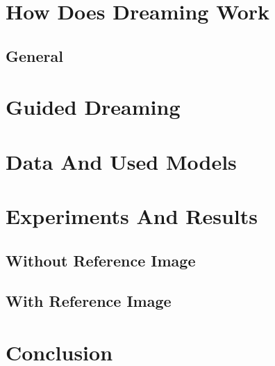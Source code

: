 \documentclass{article}[]
\begin{document}
	\section{How Does Dreaming Work}
	
	\subsection{General}
	\section{Guided Dreaming}
	
	
	
	\section{Data And Used Models}
	
	\section{Experiments And Results}
	\subsection{Without Reference Image}
	\subsection{With Reference Image}
	
	\section{Conclusion}
	
	
	
	
	
	
	
	
	 
	
	
	
\end{document}
